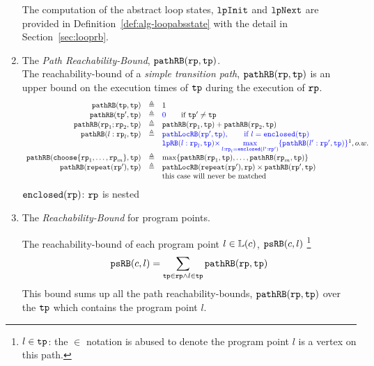 \begin{enumerate}
      The computation of the abstract loop states, $\mathtt{lpInit}$ and $\mathtt{lpNext}$ are provided in Definition~\ref{def:alg-loopabsstate} with the detail in Section~\ref{sec:looprb}.
  \item The \emph{Path Reachability-Bound}, $\mathtt{pathRB}(\mathtt{rp}, \mathtt{tp}) $.
      \\
      The reachability-bound of a \emph{simple transition path}, $\mathtt{pathRB}(\mathtt{rp}, \mathtt{tp}) $ is an upper bound on the execution times of $\mathtt{tp}$ during the execution of $\mathtt{rp}$.
      \[
        \begin{array}{rcl}
        \inoutB(\tpath, \tpath) & \triangleq & 1  \\
        \inoutB(\tpath', \tpath) & \triangleq & \highlight{0} \qquad \text{if } \tpath' \neq \tpath\\
        \inoutB(\rprog_1;\rprog_2, \tpath) & \triangleq & \inoutB(\rprog_1, \tpath) + \inoutB(\rprog_2, \tpath) \\
        \inoutB(l: \rprog_l, \tpath) & \triangleq & 
        \highlight{\outinB(\rprog', \tpath), \qquad \text{if } l = \kw{enclosed}(\tpath)}
        \\  &  &  \highlight{
        \lpchB(l:\rprog_l, \tpath ) }
        \highlight{\times \max\limits_{l:\rprog_l = \kw{enclosed}(l':\rprog')}
        \{\inoutB(l':\rprog', \tpath)\} } \footnotemark, o.w. \\
        \inoutB(\rpchoose{\rprog_1, \ldots, \rprog_m }, \tpath) & \triangleq 
        & \max\left\{ \inoutB(\rprog_1, \tpath), \ldots, \inoutB(\rprog_m, \tpath) \right\} 
        \\
        \inoutB(\rprepeat(\rprog'), \tpath) & \triangleq & \outinB(\rprepeat(\rprog'), \rprog) \times \inoutB(\rprog', \tpath)\\
        &  & \text{this case will never be matched}
        \end{array}
      \]
      $\mathtt{enclosed}(\mathtt{rp})$:  $\mathtt{rp}$ is nested
  \item The \emph{Reachability-Bound} for program points.

      The reachability-bound of each program point $l \in \mathbb{L}(c)$, $\mathtt{psRB}(c, l)$
      \footnote{$l \in \mathtt{tp}$: the $\in$ notation is abused to denote
      the program point $l$ is a vertex on this path.}
      \[ 
      \mathtt{psRB}(c, l) = 
      \sum\limits_{\mathtt{tp} \in \mathtt{rp} \land 
      l \in \mathtt{tp}} 
      \mathtt{pathRB}(\mathtt{rp}, \mathtt{tp})
      \]
      This bound sums up all the path reachability-bounds, $\mathtt{pathRB}(\mathtt{rp}, \mathtt{tp})$ over the $\mathtt{tp}$ which contains the program point $l$.
%
\end{enumerate}